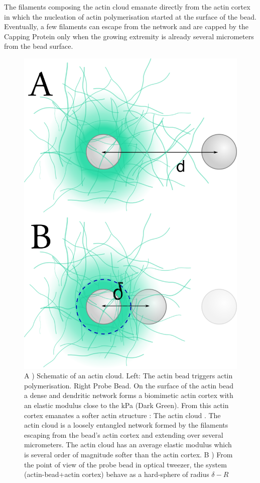 \documentclass[A4paperpaper,11pt,english]{sphinxmanual}
\begin{document}
The filaments composing the actin cloud emanate directly from the actin
cortex in which the nucleation of actin polymerisation started at the surface
of the bead. Eventually, a few filaments can escape from the network and are
capped by the Capping Protein only when the growing extremity is already several
micrometers from the bead surface.
\begin{figure}[htbp]
\centering
\capstart

\includegraphics[width=0.900\linewidth]{interp-delta.png}
\caption{A ) Schematic of an actin cloud. Left:  The actin bead triggers actin
polymerisation. Right Probe Bead. On the surface of the actin bead a dense
and dendritic network forms a biomimetic actin cortex with an elastic
modulus close to the kPa (Dark Green). From this actin cortex emanates a
softer actin structure : The actin cloud . The actin cloud is a loosely
entangled network formed by the filaments escaping from the bead's actin
cortex and extending over several micrometers. The actin cloud has an average
elastic modulus which is several order of magnitude softer than the actin
cortex. B ) From the point of view of the probe bead in optical tweezer, the
system (actin-bead+actin cortex) behave as a hard-sphere of radius
\(\delta-R\)}\label{index-latex:fig-interpretation}\end{figure}
\end{document}
